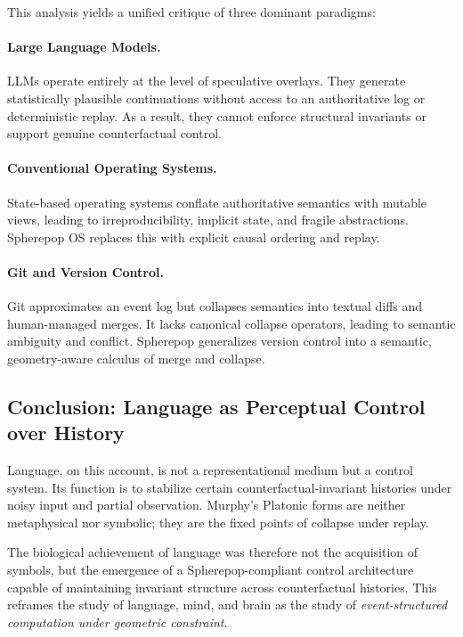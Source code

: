 \documentclass[11pt]{article}
\begin{document}
This analysis yields a unified critique of three dominant paradigms:

\paragraph{Large Language Models.}
LLMs operate entirely at the level of speculative overlays. They generate statistically plausible continuations without access to an authoritative log or deterministic replay. As a result, they cannot enforce structural invariants or support genuine counterfactual control.

\paragraph{Conventional Operating Systems.}
State-based operating systems conflate authoritative semantics with mutable views, leading to irreproducibility, implicit state, and fragile abstractions. Spherepop OS replaces this with explicit causal ordering and replay.

\paragraph{Git and Version Control.}
Git approximates an event log but collapses semantics into textual diffs and human-managed merges. It lacks canonical collapse operators, leading to semantic ambiguity and conflict. Spherepop generalizes version control into a semantic, geometry-aware calculus of merge and collapse.

\subsection{Conclusion: Language as Perceptual Control over History}

Language, on this account, is not a representational medium but a control system. Its function is to stabilize certain counterfactual-invariant histories under noisy input and partial observation. Murphy’s Platonic forms are neither metaphysical nor symbolic; they are the fixed points of collapse under replay.

The biological achievement of language was therefore not the acquisition of symbols, but the emergence of a Spherepop-compliant control architecture capable of maintaining invariant structure across counterfactual histories. This reframes the study of language, mind, and brain as the study of \emph{event-structured computation under geometric constraint}.
\end{document}
